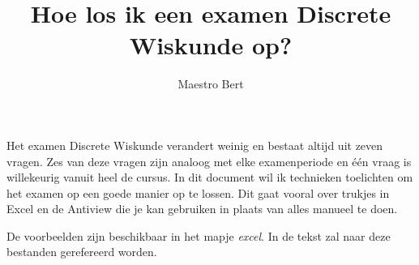 \documentclass{article}
\begin{document}
\title{Hoe los ik een examen Discrete Wiskunde op?}
\date{}
\author{Maestro Bert}
\maketitle

\tableofcontents


Het examen Discrete Wiskunde verandert weinig en bestaat altijd uit zeven vragen. Zes van deze vragen zijn analoog met elke examenperiode en één vraag is willekeurig vanuit heel de cursus. In dit document wil ik technieken toelichten om het examen op een goede manier op te lossen. Dit gaat vooral over trukjes in Excel en de Antiview die je kan gebruiken in plaats van alles manueel te doen. 

De voorbeelden zijn beschikbaar in het mapje \textit{excel}. In de tekst zal naar deze bestanden gerefereerd worden.



\end{document}
